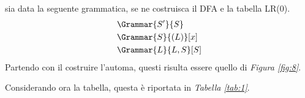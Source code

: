 \documentclass{subfiles}
\begin{document}
sia data la seguente grammatica, se ne costruisca il DFA e la tabella LR(0).
$$\begin{aligned}
         & \Grammar{S'}{S}      \\
         & \Grammar{S}{(L)}[x]  \\
         & \Grammar{L}{L, S}[S]
    \end{aligned}$$
Partendo con il costruire l'automa, questi risulta essere quello di \emph{Figura \ref{fig:8}}.


\noindent Considerando ora la tabella, questa è riportata in \emph{Tabella \ref{tab:1}}.

\end{document}

